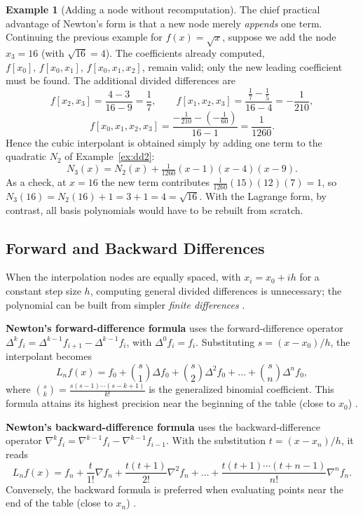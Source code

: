 \documentclass[12pt, a4paper]{article}
\theoremstyle{plain}
\theoremstyle{definition}
\newtheorem{example}[theorem]{Example}
\theoremstyle{remark}
\begin{document}
\begin{example}[Adding a node without recomputation]\label{ex:addnode}
The chief practical advantage of Newton's form is that a new node merely \emph{appends} one term. Continuing the previous example for $f(x)=\sqrt{x}$, suppose we add the node $x_3 = 16$ (with $\sqrt{16}=4$). The coefficients already computed, $f[x_0],\,f[x_0,x_1],\,f[x_0,x_1,x_2]$, remain valid; only the new leading coefficient must be found. The additional divided differences are
\[
    f[x_2,x_3] = \frac{4-3}{16-9} = \frac{1}{7}, \qquad
    f[x_1,x_2,x_3] = \frac{\tfrac{1}{7}-\tfrac{1}{5}}{16-4} = -\frac{1}{210},
\]
\[
    f[x_0,x_1,x_2,x_3] = \frac{-\tfrac{1}{210}-\left(-\tfrac{1}{60}\right)}{16-1} = \frac{1}{1260}.
\]
Hence the cubic interpolant is obtained simply by adding one term to the quadratic $N_2$ of Example~\ref{ex:dd2}:
\[
    N_3(x) = N_2(x) + \tfrac{1}{1260}(x-1)(x-4)(x-9).
\]
As a check, at $x = 16$ the new term contributes $\tfrac{1}{1260}(15)(12)(7) = 1$, so $N_3(16) = N_2(16) + 1 = 3 + 1 = 4 = \sqrt{16}$. With the Lagrange form, by contrast, all basis polynomials would have to be rebuilt from scratch.
\end{example}

\subsection{Forward and Backward Differences}

When the interpolation nodes are equally spaced, with $x_i = x_0 + i h$ for a constant step size $h$, computing general divided differences is unnecessary; the polynomial can be built from simpler \emph{finite differences} \cite{micula5}.

\textbf{Newton's forward-difference formula} uses the forward-difference operator $\Delta^k f_i = \Delta^{k-1} f_{i+1} - \Delta^{k-1} f_i$, with $\Delta^0 f_i = f_i$. Substituting $s = (x - x_0)/h$, the interpolant becomes
\begin{equation}\label{eq:fwd}
    L_n f(x) = f_0 + \binom{s}{1}\Delta f_0 + \binom{s}{2}\Delta^2 f_0 + \dots + \binom{s}{n}\Delta^n f_0,
\end{equation}
where $\binom{s}{k} = \tfrac{s(s-1)\cdots(s-k+1)}{k!}$ is the generalized binomial coefficient. This formula attains its highest precision near the beginning of the table (close to $x_0$) \cite{micula5}.

\textbf{Newton's backward-difference formula} uses the backward-difference operator $\nabla^k f_i = \nabla^{k-1} f_i - \nabla^{k-1} f_{i-1}$. With the substitution $t = (x - x_n)/h$, it reads
\begin{equation}\label{eq:bwd}
    L_n f(x) = f_n + \frac{t}{1!}\nabla f_n + \frac{t(t+1)}{2!}\nabla^2 f_n + \dots + \frac{t(t+1)\cdots(t+n-1)}{n!}\nabla^n f_n .
\end{equation}
Conversely, the backward formula is preferred when evaluating points near the end of the table (close to $x_n$) \cite{micula5}.
\end{document}

